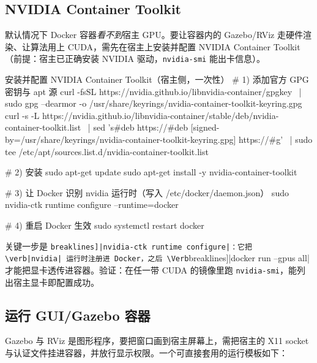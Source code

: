 \subsection{NVIDIA Container Toolkit}

默认情况下 Docker 容器\emph{看不到}宿主 GPU。要让容器内的 Gazebo/RViz 走硬件渲染、让算法用上 CUDA，需先在宿主上安装并配置 NVIDIA Container Toolkit（前提：宿主已正确安装 NVIDIA 驱动，\verb|nvidia-smi| 能出卡信息）。

\begin{codebox}[bash]{安装并配置 NVIDIA Container Toolkit（宿主侧，一次性）}
# 1) 添加官方 GPG 密钥与 apt 源
curl -fsSL https://nvidia.github.io/libnvidia-container/gpgkey \
  | sudo gpg --dearmor -o /usr/share/keyrings/nvidia-container-toolkit-keyring.gpg
curl -s -L https://nvidia.github.io/libnvidia-container/stable/deb/nvidia-container-toolkit.list \
  | sed 's#deb https://#deb [signed-by=/usr/share/keyrings/nvidia-container-toolkit-keyring.gpg] https://#g' \
  | sudo tee /etc/apt/sources.list.d/nvidia-container-toolkit.list

# 2) 安装
sudo apt-get update
sudo apt-get install -y nvidia-container-toolkit

# 3) 让 Docker 识别 nvidia 运行时（写入 /etc/docker/daemon.json）
sudo nvidia-ctk runtime configure --runtime=docker

# 4) 重启 Docker 生效
sudo systemctl restart docker
\end{codebox}

关键一步是 \Verb[breaklines]|nvidia-ctk runtime configure|：它把 \verb|nvidia| 运行时注册进 Docker，之后 \Verb[breaklines]|docker run --gpus all| 才能把显卡透传进容器。验证：在任一带 CUDA 的镜像里跑 \verb|nvidia-smi|，能列出宿主显卡即配置成功。

\subsection{运行 GUI/Gazebo 容器}

Gazebo 与 RViz 是图形程序，要把窗口画到宿主屏幕上，需把宿主的 X11 socket 与认证文件挂进容器，并放行显示权限。一个可直接套用的运行模板如下：


